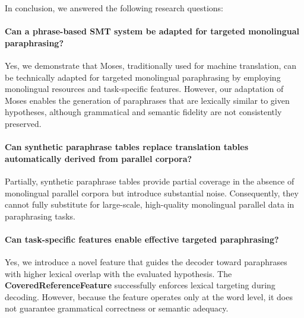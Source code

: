 \begin{mdframed}[
    linecolor=gray,
    linewidth=2pt,
    roundcorner=5,
    backgroundcolor=gray!5
]
\noindent 
In conclusion, we answered the following research questions:
\paragraph{Can a phrase-based SMT system be adapted for targeted monolingual paraphrasing?}
Yes, we demonstrate that Moses, traditionally used for machine translation, can be technically adapted for targeted monolingual paraphrasing by employing monolingual resources and task-specific features. However, our adaptation of Moses enables the generation of paraphrases that are lexically similar to given hypotheses, although grammatical and semantic fidelity are not consistently preserved.

\paragraph{ Can synthetic paraphrase tables replace translation tables automatically derived from parallel corpora?}
Partially, synthetic paraphrase tables provide partial coverage in the absence of monolingual parallel corpora but introduce substantial noise. Consequently, they cannot fully substitute for large-scale, high-quality monolingual parallel data in paraphrasing tasks.

\paragraph{Can task-specific features enable effective targeted paraphrasing?}
Yes, we introduce a novel feature that guides the decoder toward paraphrases with higher lexical overlap with the evaluated hypothesis. The \textbf{Cove\-red\-Re\-ference\-Feature} successfully enforces lexical targeting during decoding. However, because the feature operates only at the word level, it does not guarantee grammatical correctness or semantic adequacy.
\end{mdframed}